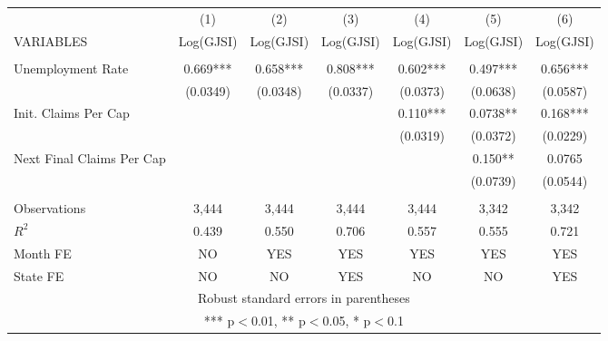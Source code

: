 \begin{center}
\begin{tabular}{lcccccc} \hline
 & (1) & (2) & (3) & (4) & (5) & (6) \\
VARIABLES & Log(GJSI) & Log(GJSI) & Log(GJSI) & Log(GJSI) & Log(GJSI) & Log(GJSI) \\ \hline
\vspace{4pt} &  &  &  &  &  &  \\
Unemployment Rate & 0.669*** & 0.658*** & 0.808*** & 0.602*** & 0.497*** & 0.656*** \\
\vspace{4pt} & (0.0349) & (0.0348) & (0.0337) & (0.0373) & (0.0638) & (0.0587) \\
Init. Claims Per Cap &  &  &  & 0.110*** & 0.0738** & 0.168*** \\
\vspace{4pt} &  &  &  & (0.0319) & (0.0372) & (0.0229) \\
Next Final Claims Per Cap &  &  &  &  & 0.150** & 0.0765 \\
 &  &  &  &  & (0.0739) & (0.0544) \\
\vspace{4pt} &  &  &  &  &  &  \\
Observations & 3,444 & 3,444 & 3,444 & 3,444 & 3,342 & 3,342 \\
$R^2$ & 0.439 & 0.550 & 0.706 & 0.557 & 0.555 & 0.721 \\
Month FE & NO & YES & YES & YES & YES & YES \\
 State FE & NO & NO & YES & NO & NO & YES \\ \hline
\multicolumn{7}{c}{ Robust standard errors in parentheses} \\
\multicolumn{7}{c}{ *** p$<$0.01, ** p$<$0.05, * p$<$0.1} \\
\end{tabular}
\end{center}
